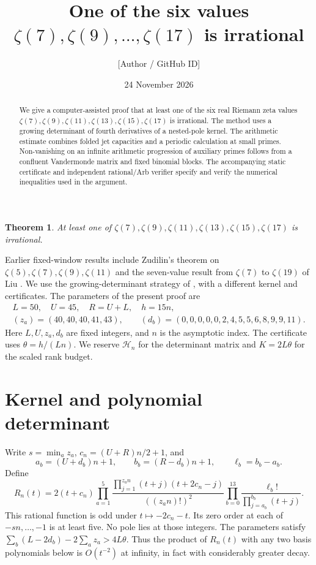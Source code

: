 \IfFileExists{TS1cmr.fd}{\documentclass[11pt]{article}}
\title{One of the six values \(\zeta(7),\zeta(9),\ldots,\zeta(17)\) is irrational}
\author{[Author / GitHub ID]}
\date{24 November 2026}
\newtheorem{theorem}{Theorem}
\newcommand{\LL}{50}
\newcommand{\UU}{45}
\newcommand{\ZZ}{40,40,40,41,43}
\newcommand{\DD}{0,0,0,0,0,2,4,5,5,6,8,9,9,11}
\newcommand{\hh}{15}
\begin{document}
\maketitle
\begin{abstract}
We give a computer-assisted proof that at least one of the six real
Riemann zeta values \(\zeta(7),\zeta(9),\zeta(11),\zeta(13),\zeta(15),\zeta(17)\)
is irrational. The method uses a growing determinant of fourth derivatives
of a nested-pole kernel. The arithmetic estimate combines folded
jet capacities and a periodic calculation at small primes. Non-vanishing
on an infinite arithmetic progression of auxiliary primes follows from
a confluent Vandermonde matrix and fixed binomial blocks. The accompanying
static certificate and independent rational/Arb verifier specify and
verify the numerical inequalities used in the argument.
\end{abstract}

\begin{theorem}
At least one of \(\zeta(7),\zeta(9),\zeta(11),\zeta(13),\zeta(15),\zeta(17)\)
is irrational.
\end{theorem}

Earlier fixed-window results include Zudilin's theorem on
\(\zeta(5),\zeta(7),\zeta(9),\zeta(11)\) \cite{zudilin} and the
seven-value result from \(\zeta(7)\) to \(\zeta(19)\) of Liu \cite{liu}.
We use the growing-determinant strategy of \cite{liu}, with a different
kernel and certificates. The parameters of the present proof are
\[
 \begin{gathered}
 L=\LL,\quad U=\UU,\quad R=U+L,\quad h=\hh n,\\
 (z_a)=(\ZZ),\qquad (d_b)=(\DD).
 \end{gathered}
 \tag{1}
\]
Here \(L,U,z_a,d_b\) are fixed integers, and \(n\) is the asymptotic index.
The certificate uses \(\theta=h/(Ln)\). We reserve \(\mathcal H_n\) for
the determinant matrix and \(K=2L\theta\) for the scaled rank budget.

\section{Kernel and polynomial determinant}
Write \(s=\min_a z_a\), \(c_n=(U+R)n/2+1\), and
\[
 a_b=(U+d_b)n+1,\qquad b_b=(R-d_b)n+1,\qquad
 \ell_b=b_b-a_b.
\]
Define
\[
 R_n(t)=2(t+c_n)
 \prod_{a=1}^5
 \frac{\prod_{j=1}^{z_an}(t+j)(t+2c_n-j)}{((z_an)!)^2}
 \prod_{b=0}^{13}\frac{\ell_b!}{\prod_{j=a_b}^{b_b}(t+j)} .
 \tag{2}
\]
This rational function is odd under \(t\mapsto-2c_n-t\).
Its zero order at each of \(-sn,\ldots,-1\) is at least five. No
pole lies at those integers. The parameters satisfy
\(\sum_b(L-2d_b)-2\sum_a z_a>4L\theta\). Thus the product of
\(R_n(t)\) with any two basis polynomials below is \(O(t^{-2})\)
at infinity, in fact with considerably greater decay.
\end{document}
